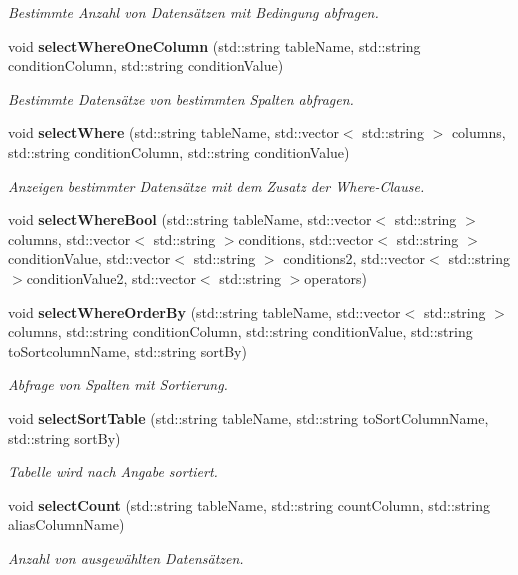 \begin{DoxyCompactItemize}
\begin{DoxyCompactList}\small\item\em Bestimmte Anzahl von Datensätzen mit Bedingung abfragen. \end{DoxyCompactList}\item 
void \textbf{ select\+Where\+One\+Column} (std\+::string table\+Name, std\+::string condition\+Column, std\+::string condition\+Value)
\begin{DoxyCompactList}\small\item\em Bestimmte Datensätze von bestimmten Spalten abfragen. \end{DoxyCompactList}\item 
void \textbf{ select\+Where} (std\+::string table\+Name, std\+::vector$<$ std\+::string $>$ columns, std\+::string condition\+Column, std\+::string condition\+Value)
\begin{DoxyCompactList}\small\item\em Anzeigen bestimmter Datensätze mit dem Zusatz der Where-\/\+Clause. \end{DoxyCompactList}\item 
void \textbf{ select\+Where\+Bool} (std\+::string table\+Name, std\+::vector$<$ std\+::string $>$ columns, std\+::vector$<$ std\+::string $>$conditions, std\+::vector$<$ std\+::string $>$condition\+Value, std\+::vector$<$ std\+::string $>$ conditions2, std\+::vector$<$ std\+::string $>$condition\+Value2, std\+::vector$<$ std\+::string $>$operators)
\item 
void \textbf{ select\+Where\+Order\+By} (std\+::string table\+Name, std\+::vector$<$ std\+::string $>$ columns, std\+::string condition\+Column, std\+::string condition\+Value, std\+::string to\+Sortcolumn\+Name, std\+::string sort\+By)
\begin{DoxyCompactList}\small\item\em Abfrage von Spalten mit Sortierung. \end{DoxyCompactList}\item 
void \textbf{ select\+Sort\+Table} (std\+::string table\+Name, std\+::string to\+Sort\+Column\+Name, std\+::string sort\+By)
\begin{DoxyCompactList}\small\item\em Tabelle wird nach Angabe sortiert. \end{DoxyCompactList}\item 
void \textbf{ select\+Count} (std\+::string table\+Name, std\+::string count\+Column, std\+::string alias\+Column\+Name)
\begin{DoxyCompactList}\small\item\em Anzahl von ausgewählten Datensätzen. \end{DoxyCompactList}\item 

\end{DoxyCompactItemize}
